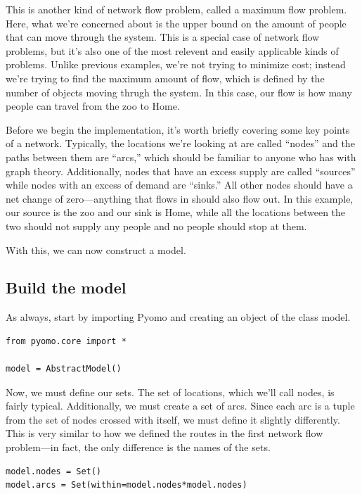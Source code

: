\documentclass{article}
\begin{document}
This is another kind of network flow problem, called a maximum flow problem.  Here, what we're concerned about is the upper bound on the amount of people that can move through the system.  This is a special case of network flow problems, but it's also one of the most relevent and easily applicable kinds of problems.  Unlike previous examples, we're not trying to minimize cost; instead we're trying to find the maximum amount of flow, which is defined by the number of objects moving thrugh the system.  In this case, our flow is how many people can travel from the zoo to Home.

Before we begin the implementation, it's worth briefly covering some key points of a network.  Typically, the locations we're looking at are called ``nodes'' and the paths between them are ``arcs,'' which should be familiar to anyone who has with graph theory.  Additionally, nodes that have an excess supply are called ``sources'' while nodes with an excess of demand are ``sinks.''  All other nodes should have a net change of zero---anything that flows in should also flow out.  In this example, our source is the zoo and our sink is Home, while all the locations between the two should not supply any people and no people should stop at them.

With this, we can now construct a model.

\subsection*{Build the model}

As always, start by importing Pyomo and creating an object of the class model.

\begin{verbatim}
from pyomo.core import *

model = AbstractModel()
\end{verbatim}

Now, we must define our sets.  The set of locations, which we'll call nodes, is fairly typical.  Additionally, we must create a set of arcs.  Since each arc is a tuple from the set of nodes crossed with itself, we must define it slightly differently.  This is very similar to how we defined the routes in the first network flow problem---in fact, the only difference is the names of the sets.

\begin{verbatim}
model.nodes = Set()
model.arcs = Set(within=model.nodes*model.nodes)
\end{verbatim}
\end{document}

